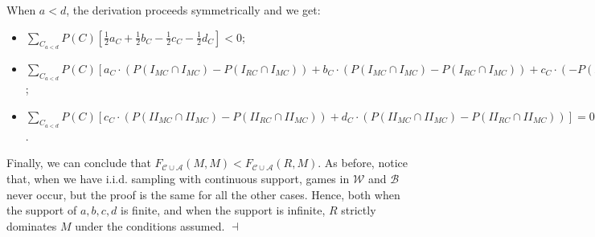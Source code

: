 \documentclass[fleqn,reqno,12pt]{article}
\theoremstyle{Satz}
\theoremstyle{Bsp}
\begin{document}
\noindent When $a<d$, the derivation proceeds symmetrically and we get: 
\begin{itemize}

\item[(1)] $\sum_{C_{a<d}} P(C)[\frac{1}{2}a_{C} + \frac{1}{2}b_{C} - \frac{1}{2}c_{C} - \frac{1}{2}d_{C}]< 0$;

\item[(2)] $\sum_{C_{a<d}} P(C)[a_{C} \cdot (P(I_{MC}\cap I_{MC}) - P(I_{RC}\cap I_{MC})) + b_{C} \cdot  (P(I_{MC}\cap I_{MC}) - P(I_{RC}\cap I_{MC})) + c_{C} \cdot (- P(II_{RC}\cap I_{MC})) + d_{C} \cdot (- P(II_{RC}\cap I_{MC}))] \leq 0$;

\item[(3)] $\sum_{C_{a<d}} P(C)[c_{C} \cdot (P(II_{MC}\cap II_{MC})- P(II_{RC}\cap II_{MC})) + d_{C} \cdot (P(II_{MC}\cap II_{MC})- P(II_{RC}\cap II_{MC}))] = 0$.

\end{itemize}
\noindent Finally, we can conclude that
$F_{\mathcal{C}\cup\mathcal{A}}(M,M)<F_{\mathcal{C}\cup\mathcal{A}}(R,M)$. As before, notice
that, when we have i.i.d. sampling with continuous support, games in $\mathcal{W}$ and
$\mathcal{B}$ never occur, but the proof is the same for all the other cases. Hence, both when
the support of $a,b,c,d$ is finite, and when the support is infinite, $R$ strictly dominates
$M$ under the conditions assumed. \hfill $\dashv$


\vspace{.5cm}
\end{document}

